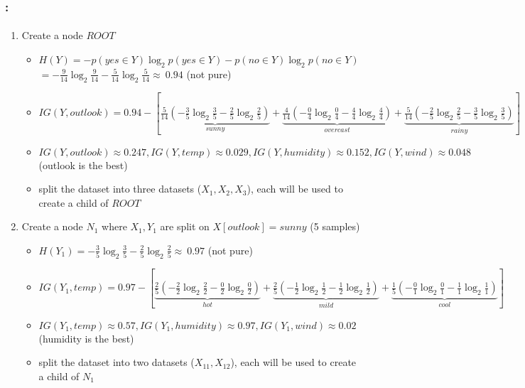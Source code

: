 \documentclass[xcolor=table]{beamer}
\begin{document}
\begin{frame}
	\frametitle{\insertshortsubtitle: \insertsection}
	\framesubtitle{\insertsubsection}
	
	\tiny
	\begin{enumerate}
		\item Create a node $ ROOT $
		\begin{itemize}\tiny\bfseries
			\item $ H(Y) = - p(yes \in Y) \log_2 p(yes\in Y) - p(no \in Y) \log_2 p(no\in Y)  $
			$ = -\frac{9}{14} \log_2 \frac{9}{14} - \frac{5}{14} \log_2 \frac{5}{14} \approx\ 0.94$ (not pure)
			\item $ IG(Y, outlook) = 0.94 - [ \underbrace{\frac{5}{14} (- \frac{3}{5} \log_2 \frac{3}{5} - \frac{2}{5} \log_2 \frac{2}{5} )}_{sunny} + \underbrace{\frac{4}{14} (- \frac{0}{4} \log_2 \frac{0}{4} - \frac{4}{4} \log_2 \frac{4}{4})}_{overcast} +  \underbrace{\frac{5}{14} (- \frac{2}{5} \log_2 \frac{2}{5} - \frac{3}{5} \log_2 \frac{3}{5})}_{rainy} ]$
			\item $ IG(Y, outlook) \approx 0.247 , IG(Y, temp) \approx 0.029 , IG(Y, humidity) \approx 0.152 ,  IG(Y, wind) \approx 0.048 $ (outlook is the best)
			\item split the dataset into three datasets ($ X_1, X_2, X_3 $), each will be used to create a child of $ ROOT $
		\end{itemize}
		
		\item Create a node $ N_1 $ where $ X_1, Y_1 $ are split on $ X[outlook] = sunny$ (5 samples)
		\begin{itemize}\tiny\bfseries
			\item $ H(Y_1) = - \frac{3}{5} \log_2 \frac{3}{5} - \frac{2}{5} \log_2 \frac{2}{5} \approx\ 0.97$ (not pure)
			\item $ IG(Y_1, temp) = 0.97 - [ \underbrace{\frac{2}{5} (- \frac{2}{2} \log_2 \frac{2}{2} - \frac{0}{2} \log_2 \frac{0}{2} )}_{hot} + \underbrace{\frac{2}{5} (- \frac{1}{2} \log_2 \frac{1}{2} - \frac{1}{2} \log_2 \frac{1}{2})}_{mild} +  \underbrace{\frac{1}{5} (- \frac{0}{1} \log_2 \frac{0}{1} - \frac{1}{1} \log_2 \frac{1}{1})}_{cool} ]$
			\item $ IG(Y_1, temp) \approx 0.57 , IG(Y_1, humidity) \approx 0.97 ,  IG(Y_1, wind) \approx 0.02 $ (humidity is the best)
			\item split the dataset into two datasets ($ X_{11}, X_{12}$), each will be used to create a child of $ N_1 $
		\end{itemize}
		

\end{enumerate}
\end{frame}
\end{document}
